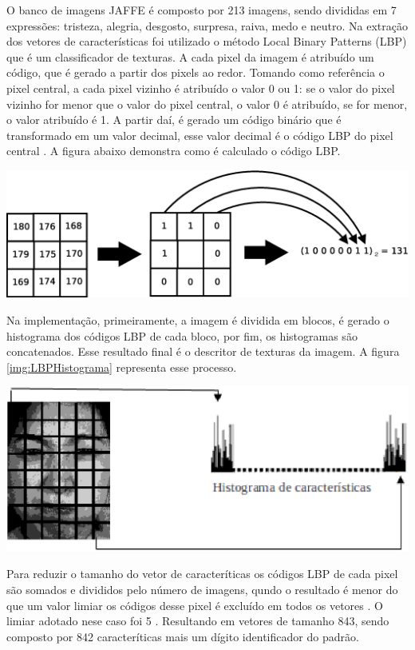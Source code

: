 \begin{itemize}
O banco de imagens JAFFE é composto por 213 imagens, sendo divididas em 7 expressões: tristeza, alegria, desgosto, surpresa, raiva, medo e neutro.
Na extração dos vetores de características foi utilizado o método Local Binary Patterns (LBP) que é um classificador de texturas. A cada pixel da imagem é atribuído um código, que é gerado a partir dos pixels ao redor. Tomando como referência o pixel central, a cada pixel vizinho é atribuído o valor 0 ou 1: se o valor do pixel vizinho for menor que o valor do pixel central, o valor 0 é atribuído, se for menor, o valor atribuído é 1. A partir daí, é gerado um código binário que é transformado em um valor decimal, esse valor decimal é o código LBP do pixel central \cite{LBPShan2009}. A figura abaixo demonstra como é calculado o código LBP.

\begin{center}
	\includegraphics[scale=0.5]{graficos/LBP}
	\label{img:LBP}
\end{center}

Na implementação, primeiramente, a imagem é dividida em blocos, é gerado o histograma dos códigos LBP de cada bloco, por fim, os histogramas são concatenados. Esse resultado final é o descritor de texturas da imagem. A figura \ref{img:LBPHistograma} representa esse processo.

\begin{center}
	\includegraphics[scale=0.5]{graficos/histograma}
	\label{img:LBPHistograma}
\end{center}

Para reduzir o tamanho do vetor de caracteríticas os códigos LBP de cada pixel são somados e divididos pelo número de imagens, qundo o resultado é menor do que um valor limiar os códigos desse pixel é excluído em todos os vetores \cite{Feng}. O limiar adotado nese caso foi 5 \cite{LBPShan2009}. Resultando em vetores de tamanho 843, sendo composto por 842 caracteríticas mais um dígito identificador do padrão. 
\end{itemize}

